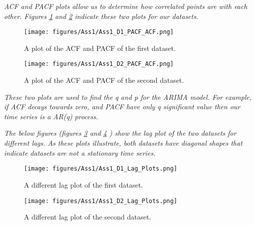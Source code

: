 \textit{\gls{ACF} and \gls{PACF} plots allow us to determine how correlated points are with each other. Figures \ref{fig:Ass1_D1_PACF_ACF} and \ref{fig:Ass1_D2_PACF_ACF} indicate these two plots for our datasets. }



\begin{figure}[H]
    \centering
    \begin{minipage}[b]{1\textwidth}
        \texttt{[image: figures/Ass1/Ass1\_D1\_PACF\_ACF.png]}
    \end{minipage}
    \caption{A plot of the \gls{ACF} and \gls{PACF} of the first dataset.}
    \label{fig:Ass1_D1_PACF_ACF}
\end{figure}

\begin{figure}[H]
    \centering
    \begin{minipage}[b]{1\textwidth}
        \texttt{[image: figures/Ass1/Ass1\_D2\_PACF\_ACF.png]}
    \end{minipage}
    \caption{A plot of the \gls{ACF} and \gls{PACF} of the second dataset.}
    \label{fig:Ass1_D2_PACF_ACF}
\end{figure}


\textit{These two plots are used to find the q and p for the ARIMA model. For example, if \gls{ACF} decays towards zero, and \gls{PACF} have only q significant value then our time series is a AR(q) process.}



\textit{The below figures (figures \ref{fig:Ass1_D1_Lag_Plots} and \ref{fig:Ass1_D2_Lag_Plots} ) show the lag plot of the two datasets for different lags. As these plots illustrate, both datasets have diagonal shapes that indicate datasets are not a stationary time series.  }


\begin{figure}[H]
    \centering
    \begin{minipage}[b]{1\textwidth}
        \texttt{[image: figures/Ass1/Ass1\_D1\_Lag\_Plots.png]}
    \end{minipage}
    \caption{A different lag plot of the first dataset.}
    \label{fig:Ass1_D1_Lag_Plots}
\end{figure}

\begin{figure}[H]
    \centering
    \begin{minipage}[b]{1\textwidth}
        \texttt{[image: figures/Ass1/Ass1\_D2\_Lag\_Plots.png]}
    \end{minipage}
    \caption{A different lag plot of the second dataset.}
    \label{fig:Ass1_D2_Lag_Plots}
\end{figure}



